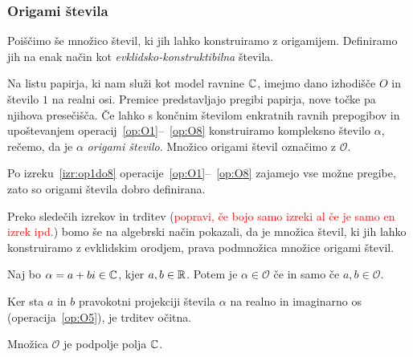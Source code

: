 \subsubsection{Origami števila}
\label{origami_konstruktibilnost}

Poiščimo še množico števil, ki jih lahko konstruiramo z origamijem. Definiramo jih na enak način kot \emph{evklidsko-konstruktibilna} števila.

\begin{definicija}
    Na listu papirja, ki nam služi kot model ravnine $\mathbb C$, imejmo dano izhodišče $O$ in število $1$ na realni osi. Premice predstavljajo pregibi papirja, nove točke pa njihova presečišča. Če lahko s končnim številom enkratnih ravnih prepogibov in upoštevanjem operacij~\ref{op:O1}--~\ref{op:O8} konstruiramo kompleksno število $\alpha$, rečemo, da je $\alpha$ \emph{origami število}. Množico origami števil označimo z $\mathcal{O}$.
\end{definicija}

\begin{opomba}
    Po izreku~\ref{izr:op1do8} operacije~\ref{op:O1}--~\ref{op:O8} zajamejo vse možne pregibe, zato so origami števila dobro definirana.
\end{opomba}

Preko sledečih izrekov in trditev (\textcolor{red}{popravi, če bojo samo izreki al če je samo en izrek ipd.}) bomo še na algebrski način pokazali, da je množica števil, ki jih lahko konstruiramo z evklidskim orodjem, prava podmnožica množice origami števil.

\begin{trditev}
    \label{trd:zaprt_koord}
    Naj bo $\alpha = a + bi \in \mathbb C$, kjer $a, b \in \mathbb R$. Potem je $\alpha \in \mathcal{O}$ če in samo če $a, b \in \mathcal{O}$.
\end{trditev}
\begin{dokaz}
    Ker sta $a$ in $b$ pravokotni projekciji števila $\alpha$ na realno in imaginarno os (operacija~\ref{op:O5}), je trditev očitna.
\end{dokaz}

\begin{izrek}
    \label{izr:podpolje}
    Množica $\mathcal{O}$ je podpolje polja $\mathbb C$.
\end{izrek}

